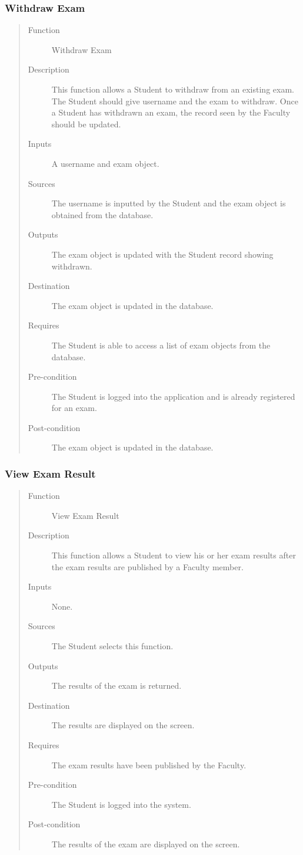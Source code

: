 \subsubsection{Withdraw Exam} 
\begin{quote} %
\begin{description}
\item[Function]
   Withdraw Exam
\item[Description]
   This function allows a Student to withdraw from an existing exam. The Student
   should give username and the exam to withdraw. Once a Student has withdrawn
   an exam, the record seen by the Faculty should be updated.
\item[Inputs]
   A username and exam object.
\item[Sources]
   The username is inputted by the Student and the exam object is obtained from
   the database.
\item[Outputs]
   The exam object is updated with the Student record showing withdrawn.
\item[Destination]
   The exam object is updated in the database.
\item[Requires]
   The Student is able to access a list of exam objects from the database.
\item[Pre-condition]
   The Student is logged into the application and is already registered for an
   exam.
\item[Post-condition]
   The exam object is updated in the database.
\end{description}
\end{quote} %

\subsubsection{View Exam Result} 
\begin{quote} %
\begin{description}
\item[Function]
   View Exam Result
\item[Description]
   This function allows a Student to view his or her exam results after the exam
   results are published by a Faculty member.
\item[Inputs]
   None.
\item[Sources]
   The Student selects this function.
\item[Outputs]
   The results of the exam is returned.
\item[Destination]
   The results are displayed on the screen.
\item[Requires]
   The exam results have been published by the Faculty.
\item[Pre-condition]
   The Student is logged into the system.
\item[Post-condition]
   The results of the exam are displayed on the screen.
\end{description}
\end{quote} %
